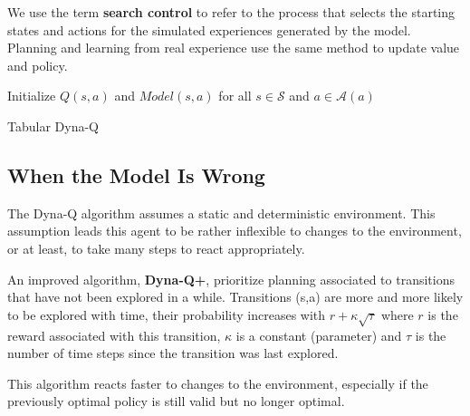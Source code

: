 \documentclass[11pt]{article}
\begin{document}
We use the term \textbf{search control} to refer to the process that selects the starting
states and actions for the simulated experiences generated by the model.
Planning and learning from real experience use the same method to update value
and policy.

\begin{algorithm}[H]
Initialize $Q(s,a)$ and $Model(s,a)$ for all $s \in \mathcal{S}$ and $a \in \mathcal{A}(a)$\\
\caption{Tabular Dyna-Q}
\end{algorithm}

\subsection{When the Model Is Wrong}
\label{sec:orgd459ea4}

The Dyna-Q algorithm assumes a static and deterministic environment. This
assumption leads this agent to be rather inflexible to changes to the
environment, or at least, to take many steps to react appropriately.

An improved algorithm, \textbf{Dyna-Q+}, prioritize planning associated to transitions
that have not been explored in a while. Transitions (s,a) are more and more
likely to be explored with time, their probability increases with \(r + \kappa
\sqrt{\tau}\) where \(r\) is the reward associated with this transition, \(\kappa\)
is a constant (parameter) and \(\tau\) is the number of time steps since the
transition was last explored.

This algorithm reacts faster to changes to the environment, especially if the
previously optimal policy is still valid but no longer optimal.
\end{document}
